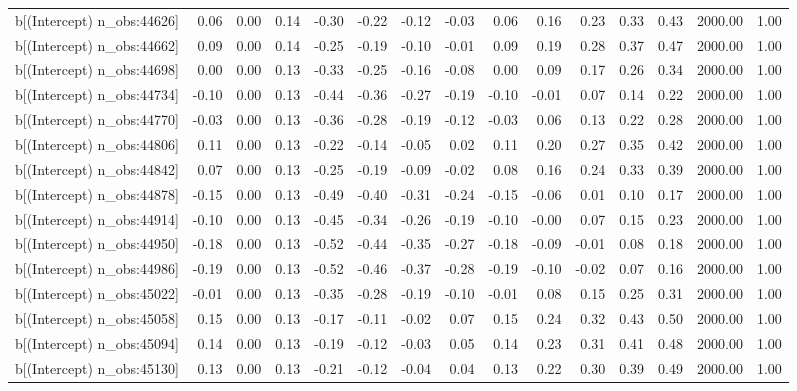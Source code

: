 \begin{table}[ht]
\begin{tabular}{rrrrrrrrrrrrrrr}
  b[(Intercept) n\_obs:44626] & 0.06 & 0.00 & 0.14 & -0.30 & -0.22 & -0.12 & -0.03 & 0.06 & 0.16 & 0.23 & 0.33 & 0.43 & 2000.00 & 1.00 \\ 
  b[(Intercept) n\_obs:44662] & 0.09 & 0.00 & 0.14 & -0.25 & -0.19 & -0.10 & -0.01 & 0.09 & 0.19 & 0.28 & 0.37 & 0.47 & 2000.00 & 1.00 \\ 
  b[(Intercept) n\_obs:44698] & 0.00 & 0.00 & 0.13 & -0.33 & -0.25 & -0.16 & -0.08 & 0.00 & 0.09 & 0.17 & 0.26 & 0.34 & 2000.00 & 1.00 \\ 
  b[(Intercept) n\_obs:44734] & -0.10 & 0.00 & 0.13 & -0.44 & -0.36 & -0.27 & -0.19 & -0.10 & -0.01 & 0.07 & 0.14 & 0.22 & 2000.00 & 1.00 \\ 
  b[(Intercept) n\_obs:44770] & -0.03 & 0.00 & 0.13 & -0.36 & -0.28 & -0.19 & -0.12 & -0.03 & 0.06 & 0.13 & 0.22 & 0.28 & 2000.00 & 1.00 \\ 
  b[(Intercept) n\_obs:44806] & 0.11 & 0.00 & 0.13 & -0.22 & -0.14 & -0.05 & 0.02 & 0.11 & 0.20 & 0.27 & 0.35 & 0.42 & 2000.00 & 1.00 \\ 
  b[(Intercept) n\_obs:44842] & 0.07 & 0.00 & 0.13 & -0.25 & -0.19 & -0.09 & -0.02 & 0.08 & 0.16 & 0.24 & 0.33 & 0.39 & 2000.00 & 1.00 \\ 
  b[(Intercept) n\_obs:44878] & -0.15 & 0.00 & 0.13 & -0.49 & -0.40 & -0.31 & -0.24 & -0.15 & -0.06 & 0.01 & 0.10 & 0.17 & 2000.00 & 1.00 \\ 
  b[(Intercept) n\_obs:44914] & -0.10 & 0.00 & 0.13 & -0.45 & -0.34 & -0.26 & -0.19 & -0.10 & -0.00 & 0.07 & 0.15 & 0.23 & 2000.00 & 1.00 \\ 
  b[(Intercept) n\_obs:44950] & -0.18 & 0.00 & 0.13 & -0.52 & -0.44 & -0.35 & -0.27 & -0.18 & -0.09 & -0.01 & 0.08 & 0.18 & 2000.00 & 1.00 \\ 
  b[(Intercept) n\_obs:44986] & -0.19 & 0.00 & 0.13 & -0.52 & -0.46 & -0.37 & -0.28 & -0.19 & -0.10 & -0.02 & 0.07 & 0.16 & 2000.00 & 1.00 \\ 
  b[(Intercept) n\_obs:45022] & -0.01 & 0.00 & 0.13 & -0.35 & -0.28 & -0.19 & -0.10 & -0.01 & 0.08 & 0.15 & 0.25 & 0.31 & 2000.00 & 1.00 \\ 
  b[(Intercept) n\_obs:45058] & 0.15 & 0.00 & 0.13 & -0.17 & -0.11 & -0.02 & 0.07 & 0.15 & 0.24 & 0.32 & 0.43 & 0.50 & 2000.00 & 1.00 \\ 
  b[(Intercept) n\_obs:45094] & 0.14 & 0.00 & 0.13 & -0.19 & -0.12 & -0.03 & 0.05 & 0.14 & 0.23 & 0.31 & 0.41 & 0.48 & 2000.00 & 1.00 \\ 
  b[(Intercept) n\_obs:45130] & 0.13 & 0.00 & 0.13 & -0.21 & -0.12 & -0.04 & 0.04 & 0.13 & 0.22 & 0.30 & 0.39 & 0.49 & 2000.00 & 1.00 \\ 

\end{tabular}
\end{table}
